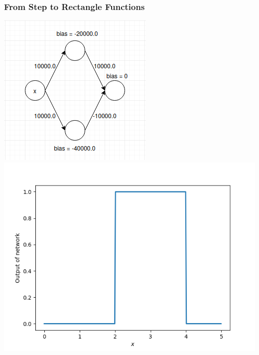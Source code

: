 \documentclass[11pt]{beamer}
\begin{document}
\begin{frame}[t]
\frametitle{From Step to Rectangle Functions}
\begin{center}
\includegraphics[scale=0.3]{nnRectangleFunction.png}
\includegraphics[scale=0.35]{xStepFunction.png}
\end{center}
\end{frame}
\end{document}
